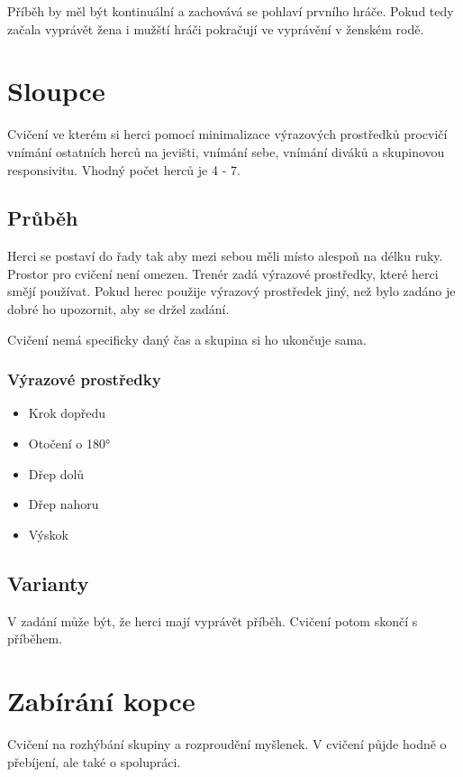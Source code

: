 Příběh by měl být kontinuální a zachovává se pohlaví prvního hráče. Pokud tedy začala vyprávět žena i mužští hráči pokračují ve vyprávění v ženském rodě. 
 
 
\needspace{5cm} \section{Sloupce} \label{sloupce} Cvičení ve kterém si herci pomocí minimalizace výrazových prostředků procvičí vnímání ostatních herců na jevišti, vnímání sebe, vnímání diváků a skupinovou responsivitu. Vhodný počet herců je 4 - 7. 
 
\subsection{ Průběh }  
Herci se postaví do řady tak aby mezi sebou měli místo alespoň na délku ruky. Prostor pro cvičení není omezen. Trenér zadá výrazové prostředky, které herci smějí používat. Pokud herec použije výrazový prostředek jiný, než bylo zadáno je dobré ho upozornit, aby se držel zadání. 
 
Cvičení nemá specificky daný čas a skupina si ho ukončuje sama. 
 
\subsubsection{ Výrazové prostředky }  
\begin{itemize}
\item  Krok dopředu
\item  Otočení o 180°
\item  Dřep dolů
\item  Dřep nahoru
\item  Výskok
\end{itemize}
 
\subsection{ Varianty } V zadání může být, že herci mají vyprávět příběh. Cvičení potom skončí s příběhem. 
 
 
 
 
 
\needspace{5cm} \section{Zabírání kopce} \label{zabírání kopce} Cvičení na rozhýbání skupiny a rozproudění myšlenek. V cvičení půjde hodně o přebíjení, ale také o spolupráci. 
 
